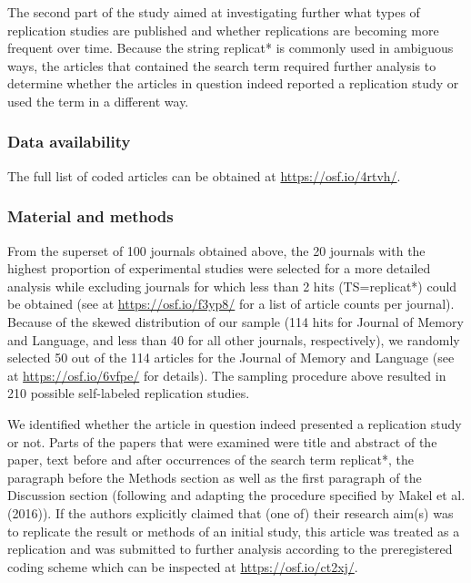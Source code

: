\documentclass[]{elsarticle} %
\begin{document}
The second part of the study aimed at investigating further what types of replication studies are published and whether replications are becoming more frequent over time.
Because the string replicat* is commonly used in ambiguous ways, the articles that contained the search term required further analysis to determine whether the articles in question indeed reported a replication study or used the term in a different way.

\hypertarget{data-availability-1}{%
\subsubsection{Data availability}\label{data-availability-1}}

The full list of coded articles can be obtained at \url{https://osf.io/4rtvh/}.

\hypertarget{material-and-methods-1}{%
\subsubsection{Material and methods}\label{material-and-methods-1}}

From the superset of 100 journals obtained above, the 20 journals with the highest proportion of experimental studies were selected for a more detailed analysis while excluding journals for which less than 2 hits (TS=replicat*) could be obtained (see at \url{https://osf.io/f3yp8/} for a list of article counts per journal).
Because of the skewed distribution of our sample (114 hits for Journal of Memory and Language, and less than 40 for all other journals, respectively), we randomly selected 50 out of the 114 articles for the Journal of Memory and Language (see at \url{https://osf.io/6vfpe/} for details).
The sampling procedure above resulted in 210 possible self-labeled replication studies.

We identified whether the article in question indeed presented a replication study or not.
Parts of the papers that were examined were title and abstract of the paper, text before and after occurrences of the search term replicat*, the paragraph before the Methods section as well as the first paragraph of the Discussion section (following and adapting the procedure specified by Makel et al. (2016)).
If the authors explicitly claimed that (one of) their research aim(s) was to replicate the result or methods of an initial study, this article was treated as a replication and was submitted to further analysis according to the preregistered coding scheme which can be inspected at \url{https://osf.io/ct2xj/}.
\end{document}
